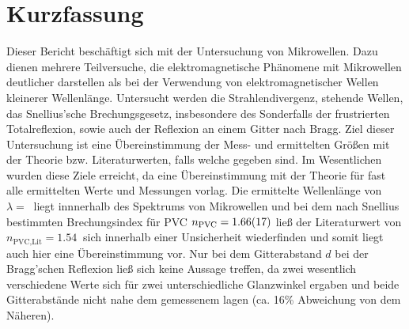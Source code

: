 \section{Kurzfassung}

	Dieser Bericht beschäftigt sich mit der Untersuchung von Mikrowellen.
	Dazu dienen mehrere Teilversuche, die elektromagnetische Phänomene mit Mikrowellen deutlicher darstellen als bei der Verwendung von elektromagnetischer Wellen kleinerer Wellenlänge.
	Untersucht werden die Strahlendivergenz, stehende Wellen, das Snellius'sche Brechungsgesetz, insbesondere des Sonderfalls der frustrierten Totalreflexion, sowie auch der Reflexion an einem Gitter nach Bragg.
	Ziel dieser Untersuchung ist eine Übereinstimmung der Mess- und ermittelten Größen mit der Theorie bzw. Literaturwerten, falls welche gegeben sind.
	Im Wesentlichen wurden diese Ziele erreicht, da eine Übereinstimmung mit der Theorie für fast alle ermittelten Werte und Messungen vorlag.
	Die ermittelte Wellenlänge von $\lambda = \SI{}{}$ liegt innnerhalb des Spektrums von Mikrowellen und bei dem nach Snellius bestimmten Brechungsindex für PVC $n_\text{PVC} = \SI{1.66+-0.17}{}$ ließ der Literaturwert von $n_\text{PVC,Lit} = \SI{1,54}{}$ sich innerhalb einer Unsicherheit wiederfinden und somit liegt auch hier eine Übereinstimmung vor.
	Nur bei dem Gitterabstand $d$ bei der Bragg'schen Reflexion ließ sich keine Aussage treffen, da zwei wesentlich verschiedene Werte sich für zwei unterschiedliche Glanzwinkel ergaben und beide Gitterabstände nicht nahe dem gemessenem lagen (ca. 16\% Abweichung von dem Näheren).